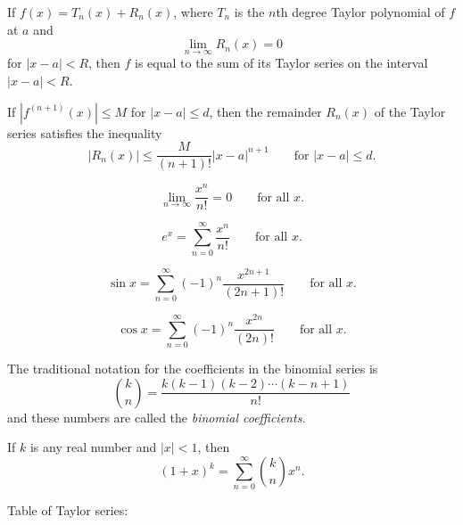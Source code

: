 \begin{theorem}
If $f(x)=T_n(x)+R_n(x)$, where $T_n$ is the $n$th degree Taylor polynomial
of $f$ at $a$ and
\[
\lim_{n\to\infty}R_n(x)=0
\]
for $|x-a|<R$, then $f$ is equal to the sum of its Taylor series on the
interval $|x-a|<R$.
\end{theorem}

\begin{theorem}
If $|f^{(n+1)}(x)|\leq M$ for $|x-a|\leq d$, then the remainder $R_n(x)$ of
the Taylor series satisfies the inequality
\[
|R_n(x)|\leq \frac{M}{(n+1)!}|x-a|^{n+1}\qquad\text{for $|x-a|\leq d$.}
\]
\end{theorem}
\begin{equation}
\label{eq:n-factorial-grows-quickly}
\lim_{n\to\infty}\frac{x^n}{n!}=0\qquad\text{for all $x$.}
\end{equation}

\begin{equation}
  \label{eq:exp-equals-its-taylor-ser}
e^x=\sum_{n=0}^\infty\frac{x^n}{n!}\qquad\text{for all $x$.}
\end{equation}

\begin{equation}
\label{eq:sin-taylor-expansion}
\sin x=\sum_{n=0}^\infty (-1)^n\frac{x^{2n+1}}{(2n+1)!}\qquad\text{for all
  $x$.}
\end{equation}

\begin{equation}
  \label{eq:cos-taylor-series}
\cos x=\sum_{n=0}^\infty(-1)^n\frac{x^{2n}}{(2n)!}\qquad\text{for all $x$.}
\end{equation}

The traditional notation for the coefficients in the binomial series is
\[
\binom k n=\frac{k(k-1)(k-2)\dotsm(k-n+1)}{n!}
\]
and these numbers are called the \emph{binomial coefficients.}

\begin{theorem}
If $k$  is any real number and $|x|<1$, then
\[
(1+x)^k=\sum_{n=0}^\infty\binom k n x^n.
\]
\end{theorem}
Table of Taylor series:

